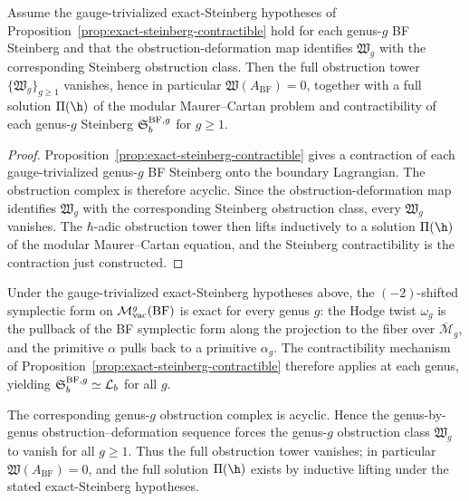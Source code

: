 \begin{corollary}
\label{cor:bf-modular-lifting-resolved}
Assume the gauge-trivialized exact-Steinberg hypotheses of
Proposition~\ref{prop:exact-steinberg-contractible} hold for each
genus-$g$ BF Steinberg and that the obstruction-deformation map
identifies $\mathfrak W_g$ with the corresponding Steinberg obstruction
class. Then the full obstruction tower $\{\mathfrak{W}_g\}_{g\ge 1}$ vanishes,
hence in particular $\mathfrak{W}(A_{\mathrm{BF}})=0$, together with a
full solution $\Pi(\h)$ of the modular Maurer--Cartan problem and
contractibility of each genus-$g$ Steinberg
$\mathfrak{S}_b^{\mathrm{BF},g}$ for $g \geq 1$.
\end{corollary}

\begin{proof}
Proposition~\ref{prop:exact-steinberg-contractible} gives a contraction
of each gauge-trivialized genus-$g$ BF Steinberg onto the boundary
Lagrangian. The obstruction complex is therefore acyclic. Since the
obstruction-deformation map identifies $\mathfrak W_g$ with the
corresponding Steinberg obstruction class, every $\mathfrak W_g$
vanishes. The $\hbar$-adic obstruction tower then lifts inductively to
a solution $\Pi(\h)$ of the modular Maurer--Cartan equation, and the
Steinberg contractibility is the contraction just constructed.
\end{proof}

\begin{remark}
Under the gauge-trivialized exact-Steinberg hypotheses above, the $(-2)$-shifted
symplectic form on $\mathcal{M}_{\mathrm{vac}}^g(\mathrm{BF})$ is exact for every genus $g$:
the Hodge twist $\omega_g$ is the pullback of the BF symplectic form
along the projection to the fiber over $\overline{\mathcal{M}}_g$,
and the primitive $\alpha$ pulls back to a primitive $\alpha_g$. The
contractibility mechanism of Proposition~\ref{prop:exact-steinberg-contractible}
therefore applies at each genus, yielding
$\mathfrak{S}_b^{\mathrm{BF},g} \simeq \mathcal{L}_b$ for all $g$.

The corresponding genus-$g$ obstruction complex is acyclic. Hence the
genus-by-genus obstruction--deformation sequence forces the genus-$g$
obstruction class $\mathfrak{W}_g$ to vanish for all $g \geq 1$.
Thus the full obstruction tower vanishes; in particular
$\mathfrak{W}(A_{\mathrm{BF}})=0$, and the full solution $\Pi(\h)$ exists by
inductive lifting under the stated exact-Steinberg hypotheses.
\end{remark}

